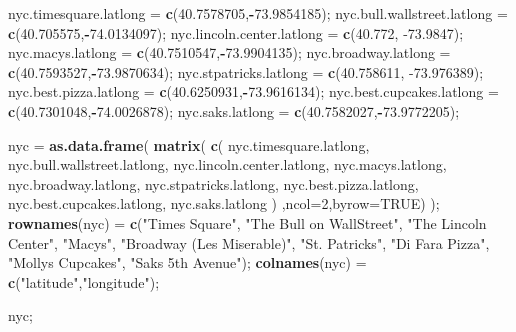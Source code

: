 \documentclass[
]{article}
\newenvironment{Shaded}{\begin{snugshade}}{\end{snugshade}}
\newcommand{\DataTypeTok}[1]{\textcolor[rgb]{0.13,0.29,0.53}{#1}}
\newcommand{\DecValTok}[1]{\textcolor[rgb]{0.00,0.00,0.81}{#1}}
\newcommand{\FloatTok}[1]{\textcolor[rgb]{0.00,0.00,0.81}{#1}}
\newcommand{\KeywordTok}[1]{\textcolor[rgb]{0.13,0.29,0.53}{\textbf{#1}}}
\newcommand{\NormalTok}[1]{#1}
\newcommand{\OperatorTok}[1]{\textcolor[rgb]{0.81,0.36,0.00}{\textbf{#1}}}
\newcommand{\OtherTok}[1]{\textcolor[rgb]{0.56,0.35,0.01}{#1}}
\newcommand{\StringTok}[1]{\textcolor[rgb]{0.31,0.60,0.02}{#1}}
\begin{document}
\begin{Shaded}
\begin{Highlighting}[]
\NormalTok{nyc.timesquare.latlong =}\StringTok{ }\KeywordTok{c}\NormalTok{(}\FloatTok{40.7578705}\NormalTok{,}\OperatorTok{{-}}\FloatTok{73.9854185}\NormalTok{);}
\NormalTok{nyc.bull.wallstreet.latlong =}\StringTok{ }\KeywordTok{c}\NormalTok{(}\FloatTok{40.705575}\NormalTok{,}\OperatorTok{{-}}\FloatTok{74.0134097}\NormalTok{);}
\NormalTok{nyc.lincoln.center.latlong =}\StringTok{ }\KeywordTok{c}\NormalTok{(}\FloatTok{40.772}\NormalTok{, }\FloatTok{{-}73.9847}\NormalTok{);}
\NormalTok{nyc.macys.latlong =}\StringTok{ }\KeywordTok{c}\NormalTok{(}\FloatTok{40.7510547}\NormalTok{,}\OperatorTok{{-}}\FloatTok{73.9904135}\NormalTok{);}
\NormalTok{nyc.broadway.latlong =}\StringTok{ }\KeywordTok{c}\NormalTok{(}\FloatTok{40.7593527}\NormalTok{,}\OperatorTok{{-}}\FloatTok{73.9870634}\NormalTok{);}
\NormalTok{nyc.stpatricks.latlong =}\StringTok{ }\KeywordTok{c}\NormalTok{(}\FloatTok{40.758611}\NormalTok{, }\FloatTok{{-}73.976389}\NormalTok{);}
\NormalTok{nyc.best.pizza.latlong =}\StringTok{ }\KeywordTok{c}\NormalTok{(}\FloatTok{40.6250931}\NormalTok{,}\OperatorTok{{-}}\FloatTok{73.9616134}\NormalTok{);}
\NormalTok{nyc.best.cupcakes.latlong =}\StringTok{ }\KeywordTok{c}\NormalTok{(}\FloatTok{40.7301048}\NormalTok{,}\OperatorTok{{-}}\FloatTok{74.0026878}\NormalTok{);}
\NormalTok{nyc.saks.latlong =}\StringTok{ }\KeywordTok{c}\NormalTok{(}\FloatTok{40.7582027}\NormalTok{,}\OperatorTok{{-}}\FloatTok{73.9772205}\NormalTok{);}

\NormalTok{nyc =}\StringTok{ }\KeywordTok{as.data.frame}\NormalTok{( }\KeywordTok{matrix}\NormalTok{( }\KeywordTok{c}\NormalTok{(  nyc.timesquare.latlong,}
\NormalTok{                        nyc.bull.wallstreet.latlong,}
\NormalTok{                        nyc.lincoln.center.latlong,}
\NormalTok{                        nyc.macys.latlong,}
\NormalTok{                        nyc.broadway.latlong,}
\NormalTok{                        nyc.stpatricks.latlong,}
\NormalTok{                        nyc.best.pizza.latlong,}
\NormalTok{                        nyc.best.cupcakes.latlong,}
\NormalTok{                        nyc.saks.latlong}
\NormalTok{                      )}
\NormalTok{                    ,}\DataTypeTok{ncol=}\DecValTok{2}\NormalTok{,}\DataTypeTok{byrow=}\OtherTok{TRUE}\NormalTok{) );}
  \KeywordTok{rownames}\NormalTok{(nyc) =}\StringTok{ }\KeywordTok{c}\NormalTok{(}\StringTok{"Times Square"}\NormalTok{, }\StringTok{"The Bull on WallStreet"}\NormalTok{, }\StringTok{"The Lincoln Center"}\NormalTok{, }\StringTok{"Macy\textquotesingle{}s"}\NormalTok{, }\StringTok{"Broadway (Les Miserable)"}\NormalTok{, }\StringTok{"St. Patrick\textquotesingle{}s"}\NormalTok{, }\StringTok{"Di Fara Pizza"}\NormalTok{, }\StringTok{"Molly\textquotesingle{}s Cupcakes"}\NormalTok{, }\StringTok{"Saks 5th Avenue"}\NormalTok{);}
  \KeywordTok{colnames}\NormalTok{(nyc) =}\StringTok{ }\KeywordTok{c}\NormalTok{(}\StringTok{"latitude"}\NormalTok{,}\StringTok{"longitude"}\NormalTok{);}

\NormalTok{nyc;}
\end{Highlighting}
\end{Shaded}
\end{document}
